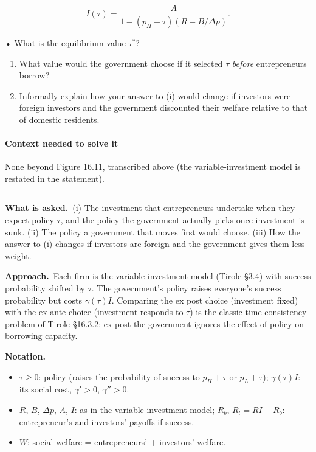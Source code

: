 \documentclass[11pt,a4paper]{article}
\newcommand{\notation}{\par\noindent\textbf{Notation.}}
\newcommand{\asked}{\par\medskip\noindent\textbf{What is asked.}~}
\newcommand{\approach}{\par\smallskip\noindent\textbf{Approach.}~}
\newcommand{\stmtend}{\par\endgroup\nopagebreak\noindent\rule{\linewidth}{0.4pt}\par\medskip}
\begin{document}
\[I(\tau) = \frac{A}{1 - (p_H + \tau)(R - B/\Delta p)}.\]

• What is the equilibrium value \(\tau^*\)?

\begin{enumerate}
\def\labelenumi{(\roman{enumi})}
\setcounter{enumi}{1}
\item
  What value would the government choose if it selected \(\tau\) \emph{before} entrepreneurs borrow?
\item
  Informally explain how your answer to (i) would change if investors were foreign investors and the
  government discounted their welfare relative to that of domestic residents.
\end{enumerate}

\paragraph{Context needed to solve it}

None beyond Figure 16.11, transcribed above (the variable-investment model is restated in the
statement).
\stmtend

\asked (i) The investment that entrepreneurs undertake when they expect policy $\tau$, and the policy the government actually picks once investment is sunk. (ii) The policy a government that moves first would choose. (iii) How the answer to (i) changes if investors are foreign and the government gives them less weight.

\approach Each firm is the variable-investment model (Tirole \S3.4) with success probability shifted by $\tau$. The government's policy raises everyone's success probability but costs $\gamma(\tau)I$. Comparing the ex post choice (investment fixed) with the ex ante choice (investment responds to $\tau$) is the classic time-consistency problem of Tirole \S16.3.2: ex post the government ignores the effect of policy on borrowing capacity.

\notation
\begin{itemize}
  \item $\tau\geq0$: policy (raises the probability of success to $p_H+\tau$ or $p_L+\tau$); $\gamma(\tau)I$: its social cost, $\gamma'>0$, $\gamma''>0$.
  \item $R$, $B$, $\Delta p$, $A$, $I$: as in the variable-investment model; $R_b$, $R_l=RI-R_b$: entrepreneur's and investors' payoffs if success.
  \item $W$: social welfare = entrepreneurs' + investors' welfare.
\end{itemize}
\end{document}
